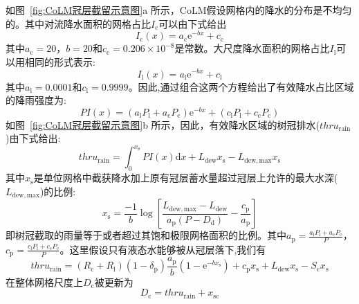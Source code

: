 如图~\ref{fig:CoLM冠层截留示意图}a 所示，CoLM假设网格内的降水的分布是不均匀的。其中对流降水面积的网格占比$I_{\mathrm {c}} $可以由下式给出
\begin{equation}
  I_{\mathrm{c}}(x)=a_{\mathrm{c}} {\mathrm e}^{-bx}+c_{\mathrm{c}}
\end{equation}
其中$a_{\mathrm {c}} =20$，$b=20$和$c_{\mathrm {c}} =0.206\times10^{-8}$是常数。大尺度降水面积的网格占比$I_{\mathrm {l}} $可以用相同的形式表示:
\begin{equation}
  I_{\mathrm{l}}(x)=a_{\mathrm{l}} {\mathrm e}^{-b x}+c_{\mathrm{l}}
\end{equation}
其中$a_{\mathrm {l}} =0.0001$和$c_{\mathrm {l}} =0.9999$。因此,通过组合这两个方程给出了有效降水占比区域的降雨强度为:
\begin{equation}
  P I(x)=\left(a_{\mathrm{l}} P_{\mathrm{l}}+a_{\mathrm{c}} P_{\mathrm{c}}\right) {\mathrm e}^{-b x}+\left(c_{\mathrm{l}} P_{\mathrm{l}}+c_{\mathrm{c}} P_{\mathrm{c}}\right)
\end{equation}
如图~\ref{fig:CoLM冠层截留示意图}b 所示，因此，有效降水区域的树冠排水($thru_{\mathrm{rain}}$)由下式给出:
\begin{equation}
  thru_{\mathrm{rain}}=\int_{0}^{x_{\mathrm{s}}} P I(x){\mathrm { d}} x+L_{\mathrm{dew}} x_{\mathrm{s}}-L_{\mathrm {dew,max}} x_{\mathrm{s}}
\end{equation}
其中$x_{\mathrm {s}} $是单位网格中截获降水加上原有冠层蓄水量超过冠层上允许的最大水深($L_{\mathrm {dew,max}}$)的比例:
\begin{equation}
  x_{\mathrm{s}}=\frac{-1}{b} \log \left[\frac{L_{\mathrm {dew,max}}-L_{\mathrm{dew}}}{a_{\mathrm{p}}\left(P-D_{\mathrm{d}}\right)}-\frac{c_{\mathrm{p}}}{a_{\mathrm{p}}}\right]
\end{equation}
即树冠截取的雨量等于或者超过其饱和极限网格面积的比例。其中$a_{\mathrm {p}} =\frac{a_{\mathrm {l}}P_{\mathrm {l}} +a_{\mathrm {c}}P_{\mathrm {c}} }{P}$，$c_{\mathrm {p}} =\frac{c_{\mathrm {l}}P_{\mathrm {l}} +c_{\mathrm {c}}P_{\mathrm {c}} }{P}$。这里假设只有液态水能够被从冠层落下,我们有
\begin{equation}
  thru_{\mathrm{rain}}=\left(R_{\mathrm{c}}+R_{\mathrm{l}}\right)\left(1-\delta_{\mathrm{p}}\right) \frac{a_{\mathrm{p}}}{b}\left(1-{\mathrm e}^{-b x_{\mathrm{s}}}\right)+c_{\mathrm{p}} x_{\mathrm{s}}+L_{\mathrm{dew}} x_{\mathrm{s}}-S_{\mathrm{c}} x_{\mathrm{s}}
\end{equation}
在整体网格尺度上$D_{\mathrm {c}} $被更新为
\begin{equation}
  D_{\mathrm {c}} =thru_{\mathrm{r a i n}}+x_{\mathrm{s c}}
\end{equation}
